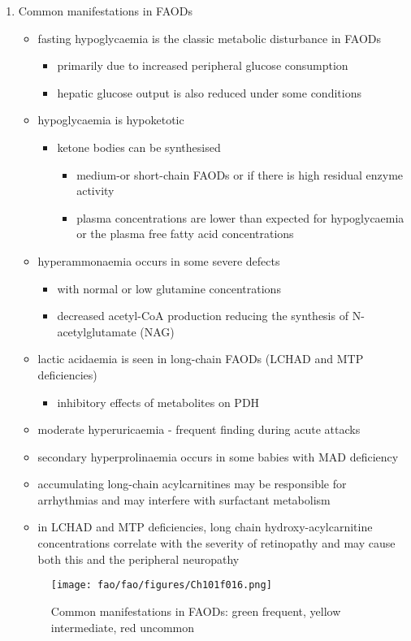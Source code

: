 \documentclass{scrartcl}
\begin{document}
\begin{enumerate}
\item Common manifestations in FAODs
\label{sec:org6a02787}
\begin{itemize}
\item fasting hypoglycaemia is the classic metabolic disturbance in FAODs
\begin{itemize}
\item primarily due to increased peripheral glucose consumption
\item hepatic glucose output is also reduced under some conditions
\end{itemize}
\item hypoglycaemia is hypoketotic
\begin{itemize}
\item ketone bodies can be synthesised
\begin{itemize}
\item medium-or short-chain FAODs or if there is high residual enzyme activity
\item plasma concentrations are lower than expected for hypoglycaemia or the plasma free fatty acid concentrations
\end{itemize}
\end{itemize}
\item hyperammonaemia occurs in some severe defects
\begin{itemize}
\item with normal or low glutamine concentrations
\item decreased acetyl-CoA production reducing the synthesis of N-acetylglutamate (NAG)
\end{itemize}
\item lactic acidaemia is seen in long-chain FAODs (LCHAD and MTP deficiencies)
\begin{itemize}
\item inhibitory effects of metabolites on PDH
\end{itemize}
\item moderate hyperuricaemia - frequent finding during acute attacks
\item secondary hyperprolinaemia occurs in some babies with MAD deficiency
\item accumulating long-chain acylcarnitines may be responsible for
arrhythmias and may interfere with surfactant metabolism
\item in LCHAD and MTP deficiencies, long chain hydroxy-acylcarnitine
concentrations correlate with the severity of retinopathy and may
cause both this and the peripheral neuropathy
\end{itemize}

\begin{figure}[htbp]
\centering
\texttt{[image: fao/fao/figures/Ch101f016.png]}
\caption{\label{fig:org693f245}Common manifestations in FAODs: green frequent, yellow intermediate, red uncommon}
\end{figure}
\end{enumerate}
\end{document}
